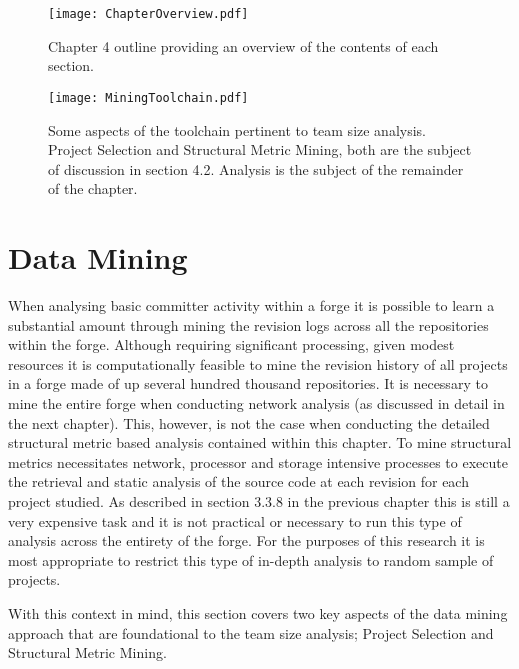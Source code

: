 \begin{landscape}
\begin{figure}[htbp!] 
\centering    
\texttt{[image: ChapterOverview.pdf]}
\caption{Chapter 4 outline providing an overview of the contents of each section.}
\label{fig:ChapterOverview}
\end{figure}
\end{landscape}

\begin{figure}[htbp!] 
\centering    
\texttt{[image: MiningToolchain.pdf]}
\caption[Some aspects of the toolchain pertinent to team size analysis.]{Some aspects of the toolchain pertinent to team size analysis. Project Selection and Structural Metric Mining, both are the subject of discussion in section 4.2. Analysis is the subject of the remainder of the chapter.}
\label{fig:MiningToolchain}
\end{figure}
 

\section{Data Mining} %
When analysing basic committer activity within a forge it is possible to learn a substantial amount through mining the revision logs across all the repositories within the forge. Although requiring significant processing, given modest resources it is computationally feasible to mine the revision history of all projects in a forge made of up several hundred thousand repositories. It is necessary to mine the entire forge when conducting network analysis (as discussed in detail in the next chapter). This, however, is not the case when conducting the detailed structural metric based analysis contained within this chapter. To mine structural metrics necessitates network, processor and storage intensive processes to execute the retrieval and static analysis of the source code at each revision for each project studied. As described in section 3.3.8 in the previous chapter this is still a very expensive task and it is not practical or necessary to run this type of analysis across the entirety of the forge. For the purposes of this research it is most appropriate to restrict this type of in-depth analysis to random sample of projects. 

With this context in mind, this section covers two key aspects of the data mining approach that are foundational to the team size analysis; Project Selection and Structural Metric Mining. 

